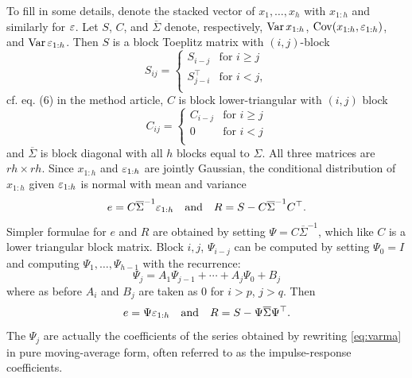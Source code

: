 \documentclass[a4paper,12pt]{extarticle} %
\begin{document}
To fill in some details, denote the stacked vector of $x_1,\ldots,x_h$ with
$x_{1:h}$ and similarly for $\varepsilon$. Let $S$, $C$, and $\overline{\Sigma}$ denote,
respectively, $\operatorname{Var} x_{1:h}$, $\operatorname{Cov}(x_{1:h}, \varepsilon_{1:h})$, and $\operatorname{Var}
\varepsilon_{1:h}$. Then $S$ is a block Toeplitz matrix with
$(i,j)$-block
%
\begin{equation}
  S_{ij} =
  \begin{cases}
    S_{i-j} & \text{for } i\geq j\\
    S_{j-i}^\top & \text{for } i<j,\\
  \end{cases}
\end{equation}
%
cf. eq. (6) in the method article, $C$ is block lower-triangular with $(i,j)$
block
%
\begin{equation}
  C_{ij} =
  \begin{cases}
    C_{i-j} & \text{for } i\geq j\\
    0 & \text{for } i<j\\
  \end{cases}
\end{equation}
%
and $\overline{\Sigma}$ is block diagonal with all $h$ blocks equal to $\Sigma$. All three
matrices are $rh \times rh$. Since $x_{1:h}$ and $\varepsilon_{1:h}$ are jointly
Gaussian, the conditional distribution of $x_{1:h}$ given $\varepsilon_{1:h}$ is normal
with mean and variance
%
\begin{equation}
  \label{eq:eR1}
e = C\overline{\Sigma}^{-1}\varepsilon_{1:h}\quad\text{and}\quad
R = S - C\overline{\Sigma}^{-1}C^\top.  
\end{equation}
%
Simpler formulae for $e$ and $R$ are obtained by setting $\Psi = C\overline{\Sigma}^{-1}$,
which like $C$ is a lower triangular block matrix. Block $i,j$, $\Psi_{i-j}$ can
be computed by setting $\Psi_0 = I$ and computing $\Psi_1,\ldots,\Psi_{h-1}$
with the recurrence:
%
\begin{equation}
  \label{eq:psi-j}
  \Psi_j = A_1\Psi_{j-1} + \cdots + A_j\Psi_0 + B_j
\end{equation}
where as before $A_i$ and $B_j$ are taken as $0$ for $i>p$, $j>q$. Then
%
\begin{equation}
  \label{eq:eR2}
  e = \Psi\varepsilon_{1:h}\quad\text{and}\quad
  R = S - \Psi\overline{\Sigma} \Psi^\top.  
\end{equation}
% 
The $\Psi_j$ are actually the coefficients of the series obtained by rewriting
\eqref{eq:varma} in pure moving-average form, often referred to as the
impulse-response coefficients. 
\end{document}
